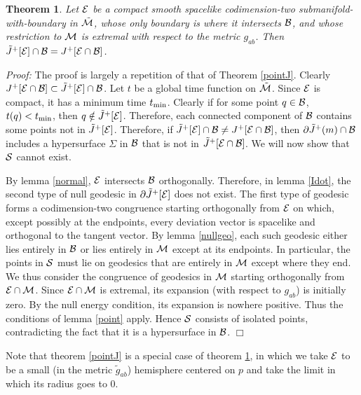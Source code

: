 \documentclass[12pt]{article}
\def\bulkJ{{\tilde J}}
\def\bulk{{\cal M}}
\def\bdy{{\cal B}}
\def\overM{\tilde \bulk}
\newtheorem{theorem}{Theorem}
\begin{document}
\begin{theorem}\label{surfaceJ}Let ${\cal E}$ be a compact smooth spacelike codimension-two submanifold-with-boundary in $\overM$, whose only boundary is where it intersects $\bdy$, and whose restriction to $\bulk$ is extremal with respect to the metric $g_{ab}$. Then $\bulkJ^+[{\cal E}] \cap\bdy=J^+[{\cal E}\cap\bdy]$.\end{theorem}

\emph{Proof:} The proof is largely a repetition of that of Theorem \ref{pointJ}. Clearly 
$J^+[{\cal E}\cap\bdy]\subset \bulkJ^+[{\cal E}]\cap\bdy$. Let $t$ be a global time function on $\overM$. Since ${\cal E}$ is compact, it has a minimum time $t_{\rm min}$. Clearly if for some point $q\in\bdy$, $t(q)<t_{\rm min}$, then $q\notin \bulkJ^+[{\cal E}]$. Therefore, each connected component of $\bdy$ contains some points not in $\bulkJ^+[{\cal E}]$. Therefore, if $\bulkJ^+[{\cal E}]\cap\bdy\neq J^+[{\cal E}\cap\bdy]$, then $\partial 
\bulkJ^+(m)\cap\bdy$ includes a hypersurface $\Sigma$ in $\bdy$ that is not in $\bulkJ^+[{\cal E}\cap\bdy]$. We will now show that ${\cal S}$ cannot exist.

By lemma \ref{normal}, ${\cal E}$ intersects $\bdy$ orthogonally. Therefore, in lemma \ref{Idot}, the second type of null geodesic in $\partial \bulkJ^+[{\cal E}]$ does not exist. The first type of geodesic forms a codimension-two congruence starting orthogonally from ${\cal E}$ on which, except possibly at the endpoints, every deviation vector is spacelike and orthogonal to the tangent vector. By lemma \ref{nullgeo}, each such geodesic either lies entirely in $\bdy$ or lies entirely in $\bulk$ except at its endpoints. In particular, the points in ${\cal S}$ must lie on geodesics that are entirely in $\bulk$ except where they end. We thus consider the congruence of geodesics in $\bulk$ starting orthogonally from ${\cal E}\cap \bulk$. Since ${\cal E}\cap \bulk$ is extremal, its expansion (with respect to $g_{ab}$) is initially zero. By the null energy condition, its expansion is nowhere positive. Thus the conditions of lemma \ref{point} apply. Hence ${\cal S}$ consists of isolated points, contradicting the fact that it is a hypersurface in $\bdy$. $\Box$\bigskip
 
Note that theorem \ref{pointJ} is a special case of theorem \ref{surfaceJ}, in which we take ${\cal E}$ to be a small (in the metric $\tilde g_{ab}$) hemisphere centered on $p$ and take the limit in which its radius goes to $0$.


\end{document}
